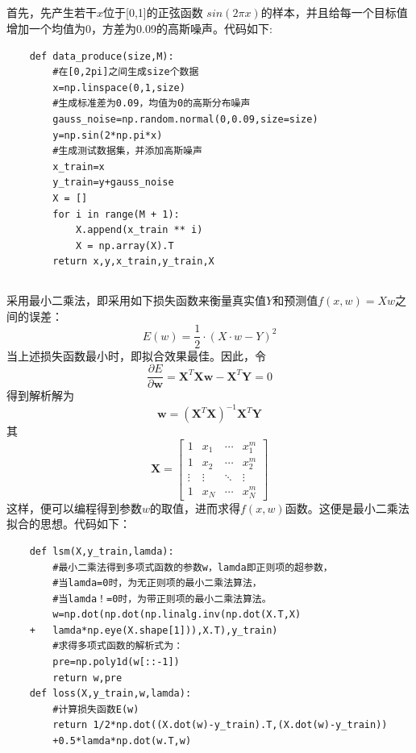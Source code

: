 \documentclass[lang=cn,a4paper,cite=authoryear]{elegantpaper}
\begin{document}
\subsection*{}
首先，先产生若干$x$位于[0,1]的正弦函数 $sin(2\pi x)$的样本，并且给每一个目标值增加一个均值为0，方差为0.09的高斯噪声。代码如下:
\begin{verbatim}
    def data_produce(size,M):
        #在[0,2pi]之间生成size个数据
        x=np.linspace(0,1,size)
        #生成标准差为0.09，均值为0的高斯分布噪声
        gauss_noise=np.random.normal(0,0.09,size=size)
        y=np.sin(2*np.pi*x)
        #生成测试数据集，并添加高斯噪声
        x_train=x
        y_train=y+gauss_noise
        X = []
        for i in range(M + 1):
            X.append(x_train ** i)
            X = np.array(X).T
        return x,y,x_train,y_train,X
\end{verbatim}
\subsection*{}
采用最小二乘法，即采用如下损失函数来衡量真实值$Y$和预测值$f(x,w)=Xw$之间的误差：
\begin{equation}
	E\left( w \right) =\frac{1}{2}\cdot \left( X\cdot w-Y \right) ^2
\end{equation}
当上述损失函数最小时，即拟合效果最佳。因此，令
\begin{equation}
	\frac{\partial E}{\partial \boldsymbol{w}}=\boldsymbol{X}^{T} \boldsymbol{X} \boldsymbol{w}-\boldsymbol{X}^{T} \boldsymbol{Y}=0
\end{equation}
得到解析解为
\begin{equation}
	\boldsymbol{w}=\left(\boldsymbol{X}^{T} \boldsymbol{X}\right)^{-1} \boldsymbol{X}^{T} \boldsymbol{Y}
\end{equation}
其
$$
\mathbf{X}=\left[\begin{array}{cccc}
	1 & x_{1} & \cdots & x_{1}^{m} \\
	1 & x_{2} & \cdots & x_{2}^{m} \\
	\vdots & \vdots & \ddots & \vdots \\
	1 & x_{N} & \cdots & x_{N}^{m}
\end{array}\right]
$$
这样，便可以编程得到参数$w$的取值，进而求得$f(x,w)$函数。这便是最小二乘法拟合的思想。代码如下：
\begin{verbatim}
    def lsm(X,y_train,lamda):
        #最小二乘法得到多项式函数的参数w，lamda即正则项的超参数，
        #当lamda=0时，为无正则项的最小二乘法算法，
        #当lamda！=0时，为带正则项的最小二乘法算法。
        w=np.dot(np.dot(np.linalg.inv(np.dot(X.T,X)
    +   lamda*np.eye(X.shape[1])),X.T),y_train)
        #求得多项式函数的解析式为：
        pre=np.poly1d(w[::-1])
        return w,pre
    def loss(X,y_train,w,lamda):
        #计算损失函数E(w)
        return 1/2*np.dot((X.dot(w)-y_train).T,(X.dot(w)-y_train))
        +0.5*lamda*np.dot(w.T,w)
\end{verbatim}
\end{document}
